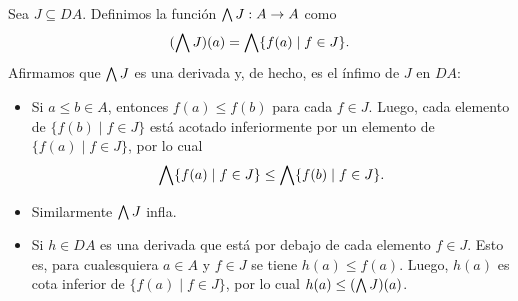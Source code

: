 Sea $J\subseteq DA$.
Definimos la función $\bigwedge J:A\to A$ como
\[
  (\bigwedge J)(a) = \bigwedge\{f(a) \mid f\in J\}
.\]
Afirmamos que $\bigwedge J$ es una derivada y, de hecho, es el ínfimo
de $J$ en $DA$:
\begin{itemize}
  \item
  Si $a\leq b\in A$, entonces $f(a)\leq f(b)$ para cada $f\in J$.
  Luego, cada elemento de $\{f(b)\mid f\in J\}$ está acotado
  inferiormente por un elemento de $\{f(a)\mid f\in J\}$, por lo
  cual
  \[
    \bigwedge\{f(a)\mid f\in J\} \leq \bigwedge\{f(b)\mid f\in J\}
  .\]
  \item
  Similarmente $\bigwedge J$ infla.
  \item
  Si $h\in DA$ es una derivada que está por debajo de cada
  elemento $f\in J$.
  Esto es, para cualesquiera $a\in A$ y $f\in J$ se tiene
  $h(a)\leq f(a)$.
  Luego, $h(a)$ es cota inferior de $\{f(a) \mid f\in J\}$, por
  lo cual $h(a)\leq (\bigwedge J)(a)$.
\end{itemize}

